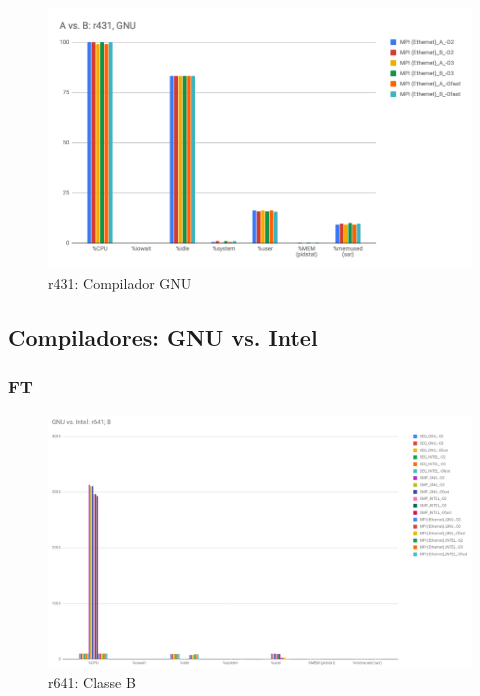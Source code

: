 \documentclass{article}
\begin{document}
\begin{appendices}
\begin{figure}[H]
    \centering
    \includegraphics[width=12cm]{Pictures/LUMZ_A_B_r431_GNU.png}
    \caption{r431: Compilador GNU}
    \label{fig:lumz_A_B_r431_gnu}
\end{figure}


\subsection{Compiladores: GNU vs. Intel}
\subsubsection{FT}

\begin{figure}[H]
    \centering
    \includegraphics[width=13cm]{Pictures/FT_GNU_Intel_r641.png}
    \caption{r641: Classe B}
    \label{fig:ft_gnu_intel_r641}
\end{figure}


\end{appendices}
\end{document}
